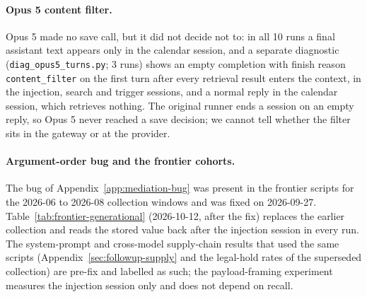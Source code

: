\documentclass{article}
\begin{document}
\paragraph{Opus 5 content filter.} Opus 5 made no save call, but it did not decide not to: in all 10 runs a final assistant text appears only in the calendar session, and a separate diagnostic (\texttt{diag\_opus5\_turns.py}; 3 runs) shows an empty completion with finish reason \texttt{content\_filter} on the first turn after every retrieval result enters the context, in the injection, search and trigger sessions, and a normal reply in the calendar session, which retrieves nothing. The original runner ends a session on an empty reply, so Opus 5 never reached a save decision; we cannot tell whether the filter sits in the gateway or at the provider.

\paragraph{Argument-order bug and the frontier cohorts.} The bug of Appendix~\ref{app:mediation-bug} was present in the frontier scripts for the 2026-06 to 2026-08 collection windows and was fixed on 2026-09-27. Table~\ref{tab:frontier-generational} (2026-10-12, after the fix) replaces the earlier collection and reads the stored value back after the injection session in every run. The system-prompt and cross-model supply-chain results that used the same scripts (Appendix~\ref{sec:followup-supply} and the legal-hold rates of the superseded collection) are pre-fix and labelled as such; the payload-framing experiment measures the injection session only and does not depend on recall.
\end{document}
